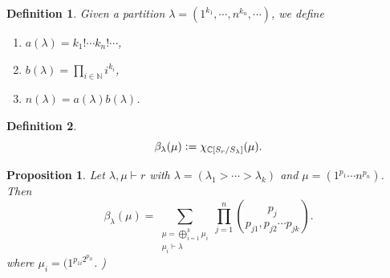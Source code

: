 \documentclass[10pt]{article}
\newtheorem{proposition}{Proposition}[section]
\newtheorem{definition}{Definition}[section]
\numberwithin{equation}{theorem}
\newcommand{\defeq}{\vcentcolon=}
\newcommand{\N}[0]{\mathbb{N}}
\newcommand{\C}[0]{\mathbb{C}}
\begin{document}

\begin{definition}
  Given a partition $\lambda=(1^{k_1},\cdots,n^{k_n},\cdots)$, we define
  \begin{enumerate}
    \item $a(\lambda) = k_1!\cdots k_n!\cdots $,
    \item $b(\lambda) = \prod_{i\in\N} i^{k_i}$,
    \item $n(\lambda) = a(\lambda)b(\lambda)$.
  \end{enumerate}
\end{definition}

\begin{definition}
  \begin{equation*}
    \beta_\lambda(\mu)\defeq \chi_{\C[S_r/S_\lambda]}(\mu).
  \end{equation*}
\end{definition}

\begin{proposition}
  Let $\lambda,\mu\vdash r$ with $\lambda = (\lambda_1>\cdots>\lambda_k)$ and $\mu = (1^{p_1}\cdots n^{p_n})$. Then 
  \begin{equation*}
    \beta_\lambda(\mu) = \sum_{\substack{\mu = \bigoplus_{i=1}^k \mu_i\\ \mu_i\vdash \lambda}}\prod_{j=1}^n{p_j \choose p_{j1},p_{j2}\cdots p_{jk}}.
  \end{equation*} 
  where $\mu_i = (1^{p_{1i}2^{p_{2i}}}$. )
\end{proposition}
\end{document}
